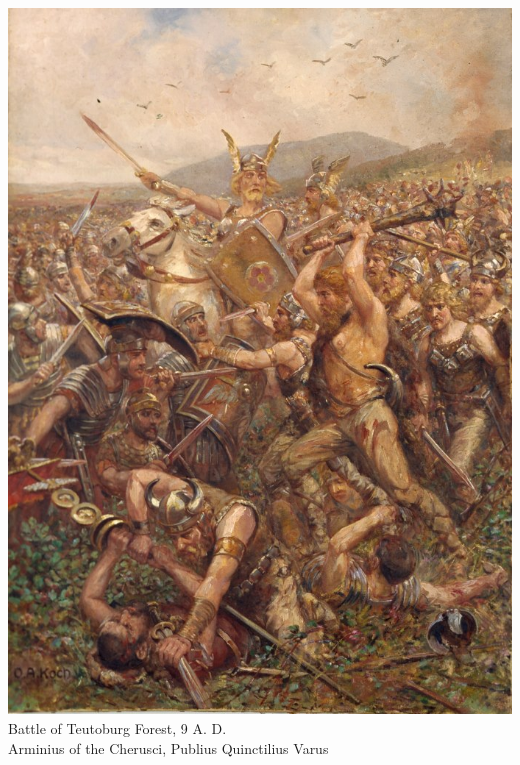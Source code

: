 \begin{frame}
    \centering
    \includegraphics[height=0.8\textheight]{img/teut2.jpg} \\
    Battle of Teutoburg Forest, 9 A. D. \\
        Arminius of the Cherusci, Publius Quinctilius Varus \\
\end{frame}

